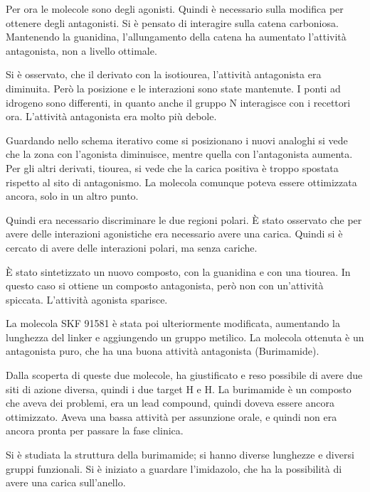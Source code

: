 Per ora le molecole sono degli agonisti. Quindi è necessario sulla
modifica per ottenere degli antagonisti. Si è pensato di interagire
sulla catena carboniosa.
Mantenendo la guanidina, l'allungamento della catena ha aumentato
l'attività antagonista, non a livello ottimale.

Si è osservato, che il derivato con la isotiourea, l'attività
antagonista era diminuita. Però la posizione e le interazioni sono state
mantenute. I ponti ad idrogeno sono differenti, in quanto anche il
gruppo N interagisce con i recettori ora. L'attività antagonista era
molto più debole.

Guardando nello schema iterativo come si posizionano i nuovi analoghi si
vede che la zona con l'agonista diminuisce, mentre quella con
l'antagonista aumenta. Per gli altri derivati, tiourea, si vede che la
carica positiva è troppo spostata rispetto al sito di antagonismo. La
molecola comunque poteva essere ottimizzata ancora, solo in un altro
punto.

Quindi era necessario discriminare le due regioni polari. È stato
osservato che per avere delle interazioni agonistiche era necessario
avere una carica. Quindi si è cercato di avere delle interazioni polari,
ma senza cariche.

\begingroup{} \endgroup

È stato sintetizzato un nuovo composto, con la guanidina e con una
tiourea. In questo caso si ottiene un composto antagonista, però non con
un'attività spiccata. L'attività agonista sparisce.


La molecola SKF 91581 è stata poi ulteriormente modificata, aumentando
la lunghezza del linker e aggiungendo un gruppo metilico. La molecola
ottenuta è un antagonista puro, che ha una buona attività antagonista
(Burimamide).


Dalla scoperta di queste due molecole, ha giustificato e reso possibile
di avere due siti di azione diversa, quindi i due target H e H.
La burimamide è un composto che aveva dei problemi, era un lead
compound, quindi doveva essere ancora ottimizzato. Aveva una bassa
attività per assunzione orale, e quindi non era ancora pronta per
passare la fase clinica.

Si è studiata la struttura della burimamide; si hanno diverse lunghezze
e diversi gruppi funzionali.
Si è iniziato a guardare l'imidazolo, che ha la possibilità di avere una
carica sull'anello.

